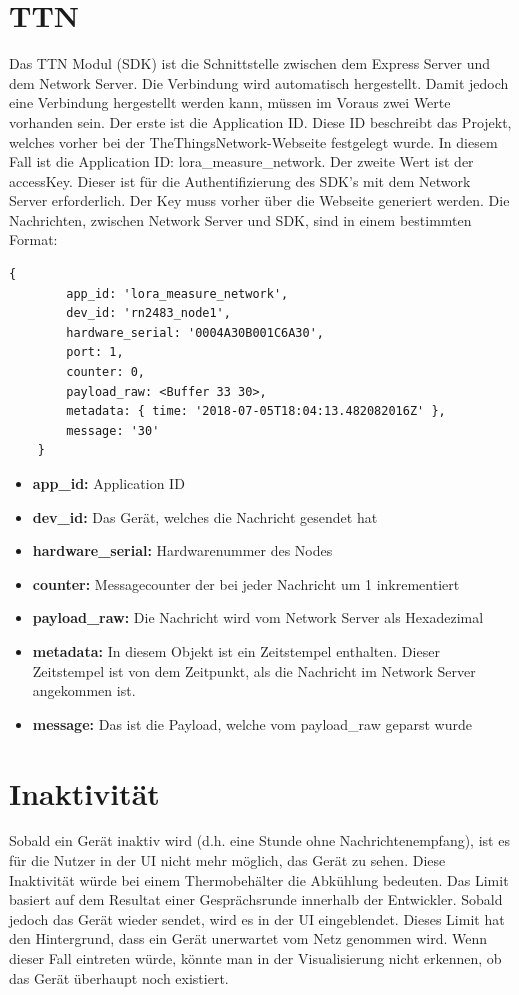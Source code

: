 \section{TTN}
Das TTN Modul (SDK) ist die Schnittstelle zwischen dem Express Server und dem Network Server. Die Verbindung wird automatisch hergestellt. Damit jedoch eine Verbindung hergestellt werden kann, müssen im Voraus zwei Werte vorhanden sein. Der erste ist die Application ID. Diese ID beschreibt das Projekt, welches vorher bei der TheThingsNetwork-Webseite festgelegt wurde. In diesem Fall ist die Application ID: lora\_measure\_network. Der zweite Wert ist der accessKey. Dieser ist für die Authentifizierung des SDK’s mit dem Network Server erforderlich. Der Key muss vorher über die Webseite generiert werden. Die Nachrichten, zwischen Network Server und SDK, sind in einem bestimmten Format:\\

\begin{lstlisting}[caption=Payload,label=lst:payload]
    { 
        app_id: 'lora_measure_network',
        dev_id: 'rn2483_node1',
        hardware_serial: '0004A30B001C6A30',
        port: 1,
        counter: 0,
        payload_raw: <Buffer 33 30>,
        metadata: { time: '2018-07-05T18:04:13.482082016Z' },
        message: '30' 
    }
\end{lstlisting}
\begin{itemize}
    \item \textbf{app\_id:} Application ID
    \item \textbf{dev\_id:} Das Gerät, welches die Nachricht gesendet hat 
    \item \textbf{hardware\_serial:} Hardwarenummer des Nodes
    \item \textbf{counter:} Messagecounter der bei jeder Nachricht um 1 inkrementiert
    \item \textbf{payload\_raw:} Die Nachricht wird vom Network Server als Hexadezimal
    \item \textbf{metadata:} In diesem Objekt ist ein Zeitstempel enthalten. Dieser Zeitstempel ist von dem Zeitpunkt, als die Nachricht im Network Server angekommen ist.
    \item \textbf{message:} Das ist die Payload, welche vom payload\_raw geparst wurde 
\end{itemize} 
\newpage
\section{Inaktivität}
Sobald ein Gerät inaktiv wird (d.h. eine Stunde ohne Nachrichtenempfang), ist es für die Nutzer in der UI nicht mehr möglich, das Gerät zu sehen. Diese Inaktivität würde bei einem Thermobehälter die Abkühlung bedeuten. Das Limit basiert auf dem Resultat einer Gesprächsrunde innerhalb der Entwickler. Sobald jedoch das Gerät wieder sendet, wird es in der UI eingeblendet. Dieses Limit hat den Hintergrund, dass ein Gerät unerwartet vom Netz genommen wird. Wenn dieser Fall eintreten würde, könnte man in der Visualisierung nicht erkennen, ob das Gerät überhaupt noch existiert.
